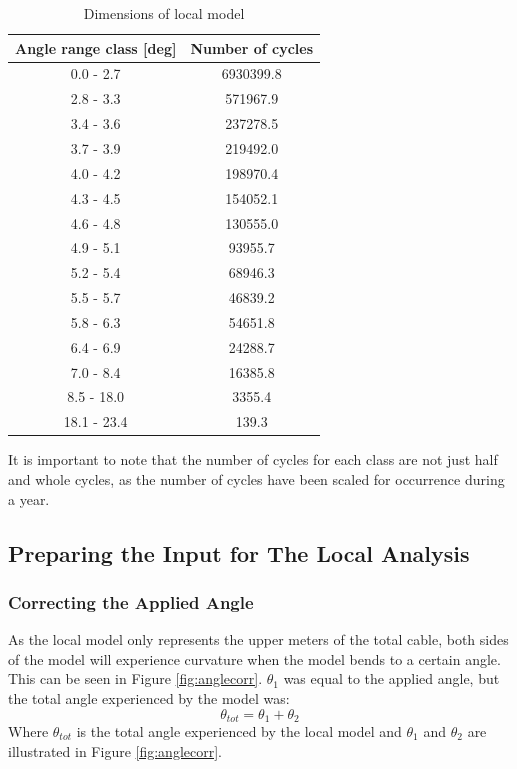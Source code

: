 \begin{table} [H]
\centering
\begin{tabular}{ |c|c|}
\hline
Angle range class [deg] & Number of cycles \\
 \hline
 \hline
0.0 - 2.7 & 6930399.8\\

2.8 - 3.3 & 571967.9\\
 
3.4 - 3.6 & 237278.5 \\
 
3.7 - 3.9& 219492.0  \\

4.0 - 4.2& 198970.4  \\

4.3  - 4.5 & 154052.1  \\

4.6 - 4.8 & 130555.0 \\

4.9 - 5.1 & 93955.7 \\

5.2 - 5.4 & 68946.3 \\

5.5 - 5.7 & 46839.2 \\

5.8 - 6.3 & 54651.8 \\

6.4 - 6.9 & 24288.7 \\

7.0 - 8.4 & 16385.8 \\

8.5 - 18.0 & 3355.4 \\

18.1 - 23.4 & 139.3  \\

 \hline
\end{tabular}
\caption{Dimensions of local model}
\label{table:angleclass}
\end{table} 
\noindent It is important to note that the number of cycles for each class are not just half and whole cycles, as the number of cycles have been scaled for occurrence during a year.\newline 
\newline
\subsection{Preparing the Input for The Local Analysis}
\subsubsection{Correcting the Applied Angle}
As the local model only represents the upper meters of the total cable, both sides of the model will experience curvature when the model bends to a certain angle. This can be seen in Figure \ref{fig:anglecorr}. $\theta_1$ was equal to the applied angle, but the total angle experienced by the model was:
\begin{equation}
    \theta_{tot}=\theta_1 + \theta_2
\end{equation}
Where $\theta_{tot}$ is the total angle experienced by the local model and $\theta_1$ and $\theta_2$ are illustrated in Figure \ref{fig:anglecorr}.


